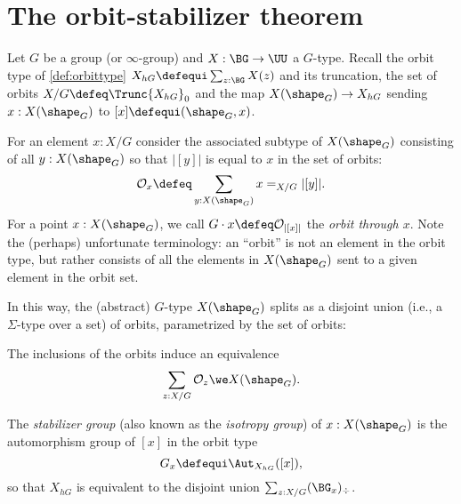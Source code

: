 \section{The orbit-stabilizer theorem}
\label{sec:orbit-stabilizer-theorem}


Let $G$ be a group (or $\infty$-group) and  $X : \BG \to \UU$  a $G$-type.
Recall the orbit type of \cref{def:orbittype} $X_{hG}\defequi
\sum_{z:\BG}X(z)$ and its truncation, the set of orbits $X / G \defeq \Trunc{X_{hG}}_0$ and the map $X(\shape_G)\to X_{hG}$ sending $x:X(\shape_G)$ to $[x]\defequi (\shape_G,x)$.


For an element $x:X/G$ consider the associated subtype of $X(\shape_G)$ consisting of
 all $y : X(\shape_G)$ so that $|[y]|$ is equal to $x$ in the set of orbits:
\[
  \mathcal O_{x} \defeq \sum_{y : X(\shape_G)} x =_{X/G} |[y]|.
\]
 For a point $x : X(\shape_G)$, we call $G\cdot x \defeq \mathcal O_{|[x]|}$ 
 the \emph{orbit through $x$}.
Note the (perhaps) unfortunate terminology: an ``orbit'' is not an element in the
orbit type, but rather consists of all the elements in $X(\shape_G)$ sent to a given element in the orbit set.

In this way, the (abstract) $G$-type $X(\shape_G)$ splits as a disjoint union (i.e., a $\Sigma$-type over a set) of orbits,
parametrized by the set of orbits:
\begin{lemma}
  \label{lem:splitting into orbits}
  The inclusions of the orbits induce an equivalence 
\[
  \sum_{z : X / G} \mathcal O_z  \we X(\shape_G).
\]
\end{lemma}

The \emph{stabilizer group}
(also known as the \emph{isotropy group}) of
$x : X(\shape_G)$ is the automorphism group of $[x]$ in the orbit type
$$G_x\defequi\Aut_{X_{hG}}([x]),$$
so that
$X_{hG}$ is equivalent to the disjoint union $\sum_{z:X/G}(\BG_x)_\div$.


